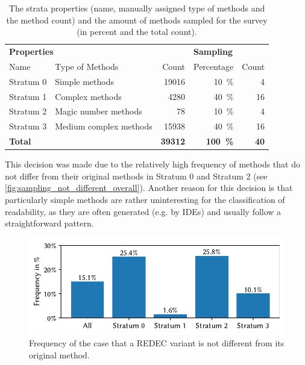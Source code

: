 \documentclass[%
class=scrreprt,
chapterprefix=false,%
open=right,%
twoside=false,%
paper=a4,%
logofile={Logo\_zentral\_farbig\_EN.png},%
thesistype=master,%
UKenglish,%
]{se2thesis}
\theoremstyle{definition}
\newcommand{\numOriginal}{39312\xspace}
\newcommand{\rdh}{REDEC\xspace}
\begin{document}
	\begin{table}[tb]
		\centering
		\caption{The strata properties (name, manually assigned type of methods and the method count) and the amount of methods sampled for the survey (in percent and the total count).}
		\label{tab:strata_info}
		\begin{tabular}{llr|rr}
			\toprule
			\multicolumn{3}{l|}{\textbf{Properties}} & \multicolumn{2}{l}{\textbf{Sampling}} \\
			Name & Type of Methods & Count & Percentage & Count \\
			\midrule
			Stratum 0 & Simple methods & 19016 & 10~\% & 4 \\
			Stratum 1 & Complex methods & 4280 & 40~\% & 16 \\
			Stratum 2 & Magic number methods & 78 & 10~\% & 4 \\
			Stratum 3 & Medium complex methods & 15938 & 40~\% & 16 \\
			\midrule
			\textbf{Total} & & \textbf{\numOriginal} & \textbf{100~\%} & \textbf{40} \\
			\bottomrule
		\end{tabular}
	\end{table}
	
	This decision was made due to the relatively high frequency of methods that do not differ from their original methods in Stratum 0 and Stratum 2 (see \autoref{fig:sampling_not_different_overall}). Another reason for this decision is that particularly simple methods are rather uninteresting for the classification of readability, as they are often generated (e.g. by IDEs) and usually follow a straightforward pattern.
	
	\begin{figure}[tb]
		\centering
		\includegraphics[width=\textwidth]{img/sampling_not_different_overall_ylim.pdf}
		\caption{Frequency of the case that a \rdh variant is not different from its original method.} 
		\label{fig:sampling_not_different_overall}
	\end{figure}
		
\end{document}
